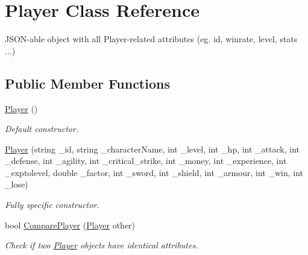 \hypertarget{class_player}{}\section{Player Class Reference}
\label{class_player}


J\+S\+O\+N-\/able object with all Player-\/related attributes (eg. id, winrate, level, stats ...)  


\subsection*{Public Member Functions}
\begin{DoxyCompactItemize}
\item 
\mbox{\hyperlink{class_player_a712a726b07cf901c040116d6d0c5cc66}{Player}} ()
\begin{DoxyCompactList}\small\item\em Default constructor. \end{DoxyCompactList}\item 
\mbox{\hyperlink{class_player_ad275d2e546547d19fca625bad0dd9dc6}{Player}} (string \+\_\+id, string \+\_\+character\+Name, int \+\_\+level, int \+\_\+hp, int \+\_\+attack, int \+\_\+defense, int \+\_\+agility, int \+\_\+critical\+\_\+strike, int \+\_\+money, int \+\_\+experience, int \+\_\+exptolevel, double \+\_\+factor, int \+\_\+sword, int \+\_\+shield, int \+\_\+armour, int \+\_\+win, int \+\_\+lose)
\begin{DoxyCompactList}\small\item\em Fully specific constructor. \end{DoxyCompactList}\item 
bool \mbox{\hyperlink{class_player_a4801fed9ec34d0eac42ca4c474b3e584}{Compare\+Player}} (\mbox{\hyperlink{class_player}{Player}} other)
\begin{DoxyCompactList}\small\item\em Check if two \mbox{\hyperlink{class_player}{Player}} objects have identical attributes. \end{DoxyCompactList}\end{DoxyCompactItemize}
